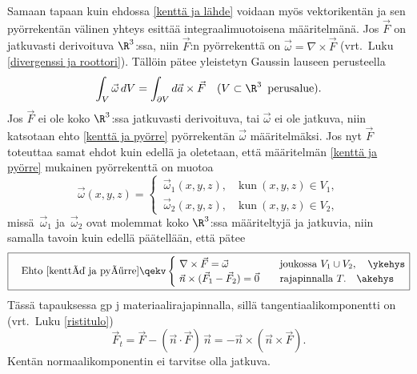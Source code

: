 Samaan tapaan kuin ehdossa \eqref{kenttä ja lähde} voidaan myös vektorikentän ja sen 
pyörrekentän välinen yhteys esittää integraalimuotoisena määritelmänä. Jos $\vec F$ on 
jatkuvasti derivoituva $\R^3$:ssa, niin $\vec F$:n pyörrekenttä on 
$\vec\omega = \nabla\times\vec F$ (vrt.\ Luku \ref{divergenssi ja roottori}). Tällöin pätee
yleistetyn Gaussin lauseen perusteella
\begin{equation} \label{kenttä ja pyörre}
\int_V \vec\omega\,dV = \int_{\partial V} d\vec a\times\vec F \quad
                        (V\subset\R^3\,\ \text{perusalue}).
\end{equation}
Jos $\vec F$ ei ole koko $\R^3$:ssa jatkuvasti derivoituva, tai $\vec\omega$ ei ole jatkuva,
niin katsotaan ehto \eqref{kenttä ja pyörre} pyörrekentän $\vec\omega$ määritelmäksi. Jos nyt
$\vec F$  toteuttaa samat ehdot kuin edellä ja oletetaan, että määritelmän
\eqref{kenttä ja pyörre} mukainen pyörrekenttä on muotoa 
\[
\vec\omega(x,y,z) = \begin{cases} \,\vec\omega_1(x,y,z), \quad \text{kun}\ (x,y,z) \in V_1, \\
                                  \,\vec\omega_2(x,y,z), \quad \text{kun}\ (x,y,z) \in V_2,
                    \end{cases}
\]
missä $\,\vec\omega_1$ ja $\,\vec\omega_2$ ovat molemmat koko $\R^3$:ssa määriteltyjä ja 
jatkuvia, niin samalla tavoin kuin edellä päätellään, että pätee
\[ \boxed{
\quad \text{Ehto \eqref{kenttä ja pyörre}} \qekv 
\begin{cases} 
\ \nabla\times\vec F = \vec\omega \quad         &\text{joukossa}\ V_1 \cup V_2, \quad\ykehys \\
\ \vec n\times(\vec F_1-\vec F_2)= \vec 0 \quad &\text{rajapinnalla}\ T. \quad\akehys
\end{cases} }
\]
Tässä tapauksessa  gp  
j materiaalirajapinnalla, sillä tangentiaalikomponentti on (vrt.\ 
Luku \ref{ristitulo})
\[ 
\vec F_t = \vec F - (\vec n\cdot\vec F)\,\vec n = - \vec n\times(\vec n\times\vec F). 
\]
Kentän normaalikomponentin ei tarvitse olla jatkuva.

